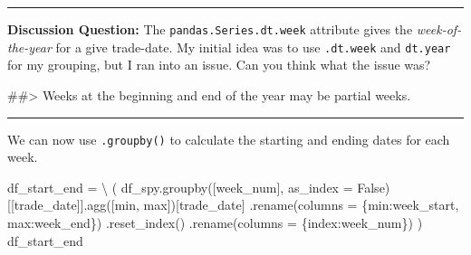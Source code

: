 \documentclass[
  letterpaper,
  DIV=11,
  numbers=noendperiod]{scrreprt}
\newenvironment{Shaded}{\begin{snugshade}}{\end{snugshade}}
\newcommand{\BuiltInTok}[1]{\textcolor[rgb]{0.00,0.23,0.31}{#1}}
\newcommand{\CommentTok}[1]{\textcolor[rgb]{0.37,0.37,0.37}{#1}}
\newcommand{\NormalTok}[1]{\textcolor[rgb]{0.00,0.23,0.31}{#1}}
\newcommand{\OperatorTok}[1]{\textcolor[rgb]{0.37,0.37,0.37}{#1}}
\newcommand{\StringTok}[1]{\textcolor[rgb]{0.13,0.47,0.30}{#1}}
\newcommand{\VariableTok}[1]{\textcolor[rgb]{0.07,0.07,0.07}{#1}}
\begin{document}
\begin{center}\rule{0.5\linewidth}{0.5pt}\end{center}

\textbf{Discussion Question:} The \texttt{pandas.Series.dt.week}
attribute gives the \emph{week-of-the-year} for a give trade-date. My
initial idea was to use \texttt{.dt.week} and \texttt{dt.year} for my
grouping, but I ran into an issue. Can you think what the issue was?

\begin{Shaded}
\begin{Highlighting}[]
\CommentTok{\#\#\textgreater{} Weeks at the beginning and end of the year may be partial weeks.}
\end{Highlighting}
\end{Shaded}

\begin{center}\rule{0.5\linewidth}{0.5pt}\end{center}

We can now use \texttt{.groupby()} to calculate the starting and ending
dates for each week.

\begin{Shaded}
\begin{Highlighting}[]
\NormalTok{df\_start\_end }\OperatorTok{=} \OperatorTok{\textbackslash{}}
\NormalTok{    (}
\NormalTok{    df\_spy.groupby([}\StringTok{\textquotesingle{}week\_num\textquotesingle{}}\NormalTok{], as\_index }\OperatorTok{=} \VariableTok{False}\NormalTok{)[[}\StringTok{\textquotesingle{}trade\_date\textquotesingle{}}\NormalTok{]].agg([}\BuiltInTok{min}\NormalTok{, }\BuiltInTok{max}\NormalTok{])[}\StringTok{\textquotesingle{}trade\_date\textquotesingle{}}\NormalTok{]}
\NormalTok{    .rename(columns }\OperatorTok{=}\NormalTok{ \{}\StringTok{\textquotesingle{}min\textquotesingle{}}\NormalTok{:}\StringTok{\textquotesingle{}week\_start\textquotesingle{}}\NormalTok{, }\StringTok{\textquotesingle{}max\textquotesingle{}}\NormalTok{:}\StringTok{\textquotesingle{}week\_end\textquotesingle{}}\NormalTok{\})}
\NormalTok{    .reset\_index()}
\NormalTok{    .rename(columns }\OperatorTok{=}\NormalTok{ \{}\StringTok{\textquotesingle{}index\textquotesingle{}}\NormalTok{:}\StringTok{\textquotesingle{}week\_num\textquotesingle{}}\NormalTok{\})}
\NormalTok{    )}
\NormalTok{df\_start\_end}
\end{Highlighting}
\end{Shaded}
\end{document}
